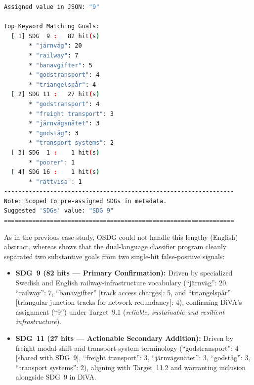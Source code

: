 \begin{casestudySection}
\begin{lstlisting}[language={bash}, basicstyle=\footnotesize, escapechar=|, breaklines=true,
    postbreak=\usebox{\lstbreakbox}, caption={Program's output}, label=lst:t_12808Output]
Assigned value in JSON: "9"

Top Keyword Matching Goals:
  [ 1] SDG  9 :   82 hit(s)
       * "järnväg": 20
       * "railway": 7
       * "banavgifter": 5
       * "godstransport": 4
       * "triangelspår": 4
  [ 2] SDG 11 :   27 hit(s)
       * "godstransport": 4
       * "freight transport": 3
       * "järnvägsnätet": 3
       * "godståg": 3
       * "transport systems": 2
  [ 3] SDG  1 :    1 hit(s)
       * "poorer": 1
  [ 4] SDG 16 :    1 hit(s)
       * "rättvisa": 1
-----------------------------------------------------------------
Note: Scoped to pre-assigned SDGs in metadata.
Suggested 'SDGs' value: "SDG 9"
=================================================================
\end{lstlisting}

As in the previous case study, OSDG could not handle this lengthy (English) abstract, whereas  shows that the dual-language classifier program cleanly separated two substantive goals from two single-hit false-positive signals:
\begin{itemize}
    \item \textbf{\gls{SDG}~9 (\num{82} hits --- Primary Confirmation):} Driven by specialized Swedish and English railway-infrastructure vocabulary (\enquote{\foreignlanguage{swedish}{järnväg}}: 20, \enquote{railway}: 7, \enquote{\foreignlanguage{swedish}{banavgifter}} [track access charges]: 5, and \enquote{\foreignlanguage{swedish}{triangelspår}} [triangular junction tracks for network redundancy]: 4), confirming \gls{DiVA}'s assignment (\enquote{9}) under Target~9.1 (\emph{reliable, sustainable and resilient infrastructure}).

    \item \textbf{\gls{SDG}~11 (\num{27} hits --- Actionable Secondary Addition):} Driven by freight modal-shift and transport-system terminology (\enquote{\foreignlanguage{swedish}{godstransport}}: 4 [shared with \gls{SDG}~9], \enquote{freight transport}: 3, \enquote{\foreignlanguage{swedish}{järnvägsnätet}}: 3, \enquote{\foreignlanguage{swedish}{godståg}}: 3, \enquote{transport systems}: 2), aligning with Target~11.2 and warranting inclusion alongside \gls{SDG}~9 in \gls{DiVA}.


\end{itemize}
\end{casestudySection}
